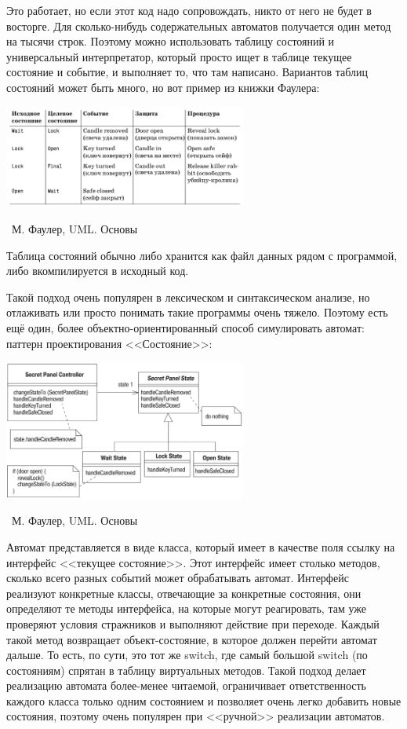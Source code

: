 \documentclass[a5paper]{article}
\newcommand{\attribution}[1] {
	\vspace{-5mm}\begin{flushright}\begin{scriptsize}%
	{\textcopyright\, #1}\end{scriptsize}\end{flushright}
}
\begin{document}
Это работает, но если этот код надо сопровождать, никто от него не будет в восторге. Для сколько-нибудь содержательных автоматов получается один метод на тысячи строк. Поэтому можно использовать таблицу состояний и универсальный интерпретатор, который просто ищет в таблице текущее состояние и событие, и выполняет то, что там написано. Вариантов таблиц состояний может быть много, но вот пример из книжки Фаулера:

\begin{center}
	\includegraphics[width=0.6\textwidth]{stateTransitionStateTable.png}
	\attribution{М. Фаулер, UML. Основы}
\end{center}

Таблица состояний обычно либо хранится как файл данных рядом с программой, либо вкомпилируется в исходный код. 

Такой подход очень популярен в лексическом и синтаксическом анализе, но отлаживать или просто понимать такие программы очень тяжело. Поэтому есть ещё один, более объектно-ориентированный способ симулировать автомат: паттерн проектирования <<Состояние>>:

\begin{center}
	\includegraphics[width=0.6\textwidth]{stateTransitionStatePattern.png}
	\attribution{М. Фаулер, UML. Основы}
\end{center}

Автомат представляется в виде класса, который имеет в качестве поля ссылку на интерфейс <<текущее состояние>>. Этот интерфейс имеет столько методов, сколько всего разных событий может обрабатывать автомат. Интерфейс реализуют конкретные классы, отвечающие за конкретные состояния, они определяют те методы интерфейса, на которые могут реагировать, там уже проверяют условия стражников и выполняют действие при переходе. Каждый такой метод возвращает объект-состояние, в которое должен перейти автомат дальше. То есть, по сути, это тот же switch, где самый большой switch (по состояниям) спрятан в таблицу виртуальных методов. Такой подход делает реализацию автомата более-менее читаемой, ограничивает ответственность каждого класса только одним состоянием и позволяет очень легко добавить новые состояния, поэтому очень популярен при <<ручной>> реализации автоматов.
\end{document}
